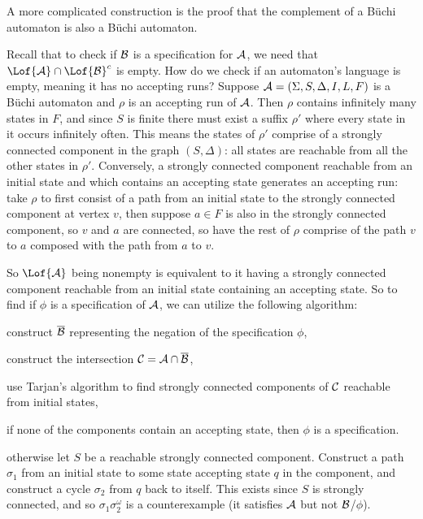 A more complicated construction is the proof that the complement of a B\"uchi automaton is also a B\"uchi automaton.

Recall that to check if ${\cal B}$ is a specification for ${\cal A}$, we need that $\Lof{\cal A}\cap\Lof{\cal B}^c$ is empty.
How do we check if an automaton's language is empty, meaning it has no accepting runs?
Suppose ${\cal A}=(\Sigma,S,\Delta,I,L,F)$ is a B\"uchi automaton and $\rho$ is an accepting run of ${\cal A}$.
Then $\rho$ contains infinitely many states in $F$, and since $S$ is finite there must exist a suffix $\rho'$ where every state in it occurs infinitely often.
This means the states of $\rho'$ comprise of a strongly connected component in the graph $(S,\Delta)$: all states are reachable from all the other states in $\rho'$.
Conversely, a strongly connected component reachable from an initial state and which contains an accepting state generates an accepting run: take $\rho$ to first consist of a path from an initial state to
the strongly connected component at vertex $v$, then suppose $a\in F$ is also in the strongly connected component, so $v$ and $a$ are connected, so have the rest of $\rho$ comprise of the path $v$ to $a$
composed with the path from $a$ to $v$.

So $\Lof{\cal A}$ being nonempty is equivalent to it having a strongly connected component reachable from an initial state containing an accepting state.
So to find if $\phi$ is a specification of ${\cal A}$, we can utilize the following algorithm:
\benum
    \item construct $\overline{\cal B}$ representing the negation of the specification $\phi$,
    \item construct the intersection ${\cal C}={\cal A}\cap\overline{\cal B}$,
    \item use Tarjan's algorithm to find strongly connected components of ${\cal C}$ reachable from initial states,
    \item if none of the components contain an accepting state, then $\phi$ is a specification.\
    \item otherwise let $S$ be a reachable strongly connected component.
        Construct a path $\sigma_1$ from an initial state to some state accepting state $q$ in the component, and construct a cycle $\sigma_2$ from $q$ back to itself.
        This exists since $S$ is strongly connected, and so $\sigma_1\sigma_2^\omega$ is a counterexample (it satisfies ${\cal A}$ but not ${\cal B}$/$\phi$).
\eenum

\bye

